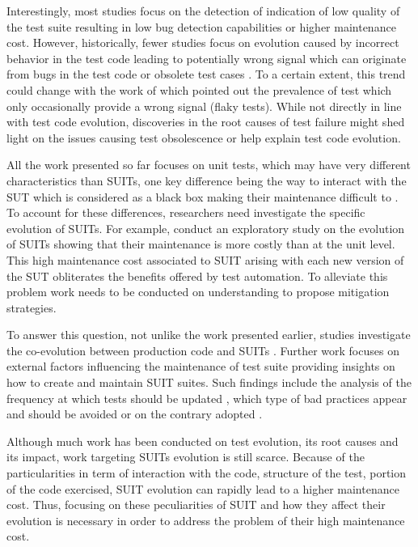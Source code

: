 Interestingly, most studies focus on the detection of indication of low quality of the test suite resulting in low bug detection capabilities or higher maintenance cost. However, historically, fewer studies focus on evolution caused by incorrect behavior in the test code leading to potentially wrong signal which can originate from bugs in the test code \cite{Vahabzadeh2015} or obsolete test cases \cite{Hao2013, Tang2015}. To a certain extent, this trend could change with the work of \textcite{Luo2014} which pointed out the prevalence of test which only occasionally provide a wrong signal (flaky tests). While not directly in line with test code evolution, discoveries in the root causes of test failure might shed light on the issues causing test obsolescence or help explain test code evolution.

All the work presented so far focuses on unit tests, which may have very different characteristics than SUITs, one key difference being the way to interact with the SUT which is considered as a black box making their maintenance difficult to \cite{Berner2005}. To account for these differences, researchers need investigate the specific evolution of SUITs. For example, \textcite{Skoglund2004} conduct an exploratory study on the evolution of SUITs showing that their maintenance is more costly than at the unit level. This high maintenance cost associated to SUIT arising with each new version of the SUT obliterates the benefits offered by test automation. To alleviate this problem work needs to be conducted on understanding to propose mitigation strategies.

To answer this question, not unlike the work presented earlier, studies investigate the co-evolution between production code and SUITs \cite{Shewchuk2010, Christophe2014}. Further work focuses on external factors influencing the maintenance of test suite \cite{Alegroth2013, Kan2013, Alegroth2016, Lavoie2017} providing insights on how to create and maintain SUIT suites. Such findings include the analysis of the frequency at which tests should be updated \cite{Alegroth2013, Alegroth2016}, which type of bad practices appear and should be avoided \cite{Chen2012, Lavoie2017} or on the contrary adopted \cite{Kan2013}.

Although much work has been conducted on test evolution, its root causes and its impact, work targeting SUITs evolution is still scarce. Because of the particularities in term of interaction with the code, structure of the test, portion of the code exercised, SUIT evolution can rapidly lead to a higher maintenance cost. Thus, focusing on these peculiarities of SUIT and how they affect their evolution is necessary in order to address the problem of their high maintenance cost.

